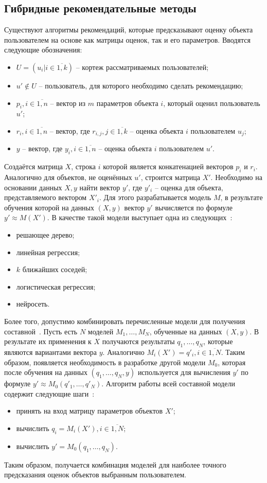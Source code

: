 \subsection{Гибридные рекомендательные методы}
Существуют алгоритмы рекомендаций, которые предсказывают оценку объекта пользователем на основе как матрицы оценок, так и его параметров.
Вводятся следующие обозначения:
\begin{itemize}
    \item $U = (u_i | i \in \overline{1,k})$ -- кортеж рассматриваемых пользователей;
    \item $u' \notin U$ -- пользователь, для которого необходимо сделать рекомендацию;
    \item $p_i, i \in \overline{1, n}$ -- вектор из $m$ параметров объекта $i$, который оценил пользователь $u'$;
    \item $r_i, i \in \overline{1,n}$ -- вектор, где $r_{i,j}, j \in \overline{1,k}$ -- оценка объекта $i$ пользователем $u_j$;
    \item $y$ -- вектор, где $y_i, i \in \overline{1,n}$ -- оценка объекта $i$ пользователем $u'$.
\end{itemize}
Создаётся матрица $X$, строка $i$ которой является конкатенацией векторов $p_i$ и $r_i$.
Аналогично для объектов, не оценённых $u'$, строится матрица $X'$.
Необходимо на основании данных $X, y$ найти вектор $y'$, где $y'_i$ -- оценка для объекта, представляемого вектором $X'_i$.
Для этого разрабатывается модель $M$, в результате обучения которой на данных $(X, y)$ вектор $y'$ вычисляется по формуле $y' \approx M(X')$.
В качестве такой модели выступает одна из следующих~\cite{segaran}:
\begin{itemize}
    \item решающее дерево;
    \item линейная регрессия;
    \item $k$ ближайших соседей;
    \item логистическая регрессия;
    \item нейросеть.
\end{itemize}

Более того, допустимо комбинировать перечисленные модели для получения составной~\cite{segaran}.
Пусть есть $N$ моделей $M_1,\dots,M_N$, обученные на данных $(X, y)$.
В результате их применения к $X$ получаются результаты $q_1,\dots,q_N$, которые являются вариантами вектора $y$.
Аналогично $M_i(X') = q'_i, i \in \overline{1,N}$.
Таким образом, появляется необходимость в разработке другой модели $M_0$, которая после обучения на данных $(q_1,\dots,q_N,y)$ используется для вычисления $y'$ по формуле $y' \approx M_0(q'_1,\dots,q'_N)$.
Алгоритм работы всей составной модели содержит следующие шаги~\cite{segaran}:
\begin{itemize}
    \item принять на вход матрицу параметров объектов $X'$;
    \item вычислить $q_i = M_i(X'), i \in \overline{1,N}$;
    \item вычислить $y' = M_0(q_1,\dots,q_N)$.
\end{itemize}
Таким образом, получается комбинация моделей для наиболее точного предсказания оценок объектов выбранным пользователем.


